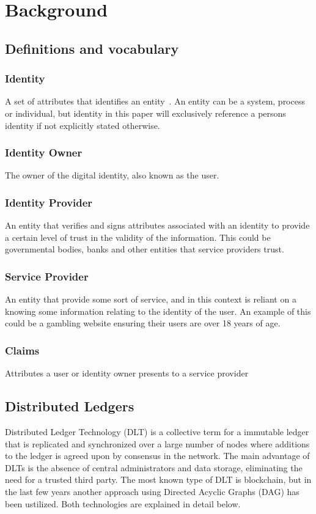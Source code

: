 \chapter{Background}
\label{chap:background}

\section{Definitions and vocabulary}
\label{sec:background_definitions}

\subsection*{Identity}
A set of attributes that identifies an entity~\cite{Weik2001}. An entity can be a system, process or individual, but identity in this paper will exclusively reference a persons identity if not explicitly stated otherwise. 
\subsection*{Identity Owner}
The owner of the digital identity, also known as the user.

\subsection*{Identity Provider}
An entity that verifies and signs attributes associated with an identity to provide a certain level of trust in the validity of the information. This could be governmental bodies, banks and other entities that service providers trust.

\subsection*{Service Provider}
An entity that provide some sort of service, and in this context is reliant on a knowing some information relating to the identity of the user. An example of this could be a gambling website ensuring their users are over 18 years of age.

\subsection*{Claims}
Attributes a user or identity owner presents to a service provider 

\section{Distributed Ledgers}
Distributed Ledger Technology (DLT) is a collective term for a immutable ledger that is replicated and synchronized over a large number of nodes where additions to the ledger is agreed upon by consensus in the network. The main advantage of DLTs is the absence of central administrators and data storage, eliminating the need for a trusted third party. The most known type of DLT is blockchain, but in the last few years another approach using Directed Acyclic Graphs (DAG) has been ustilized. Both technologies are explained in detail below.


